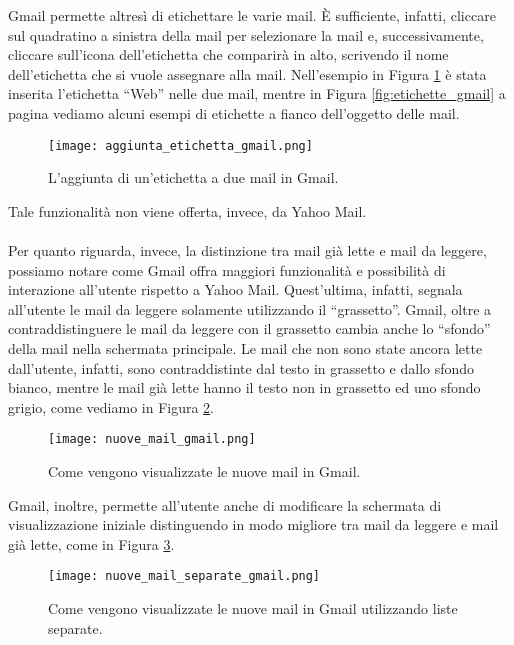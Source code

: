 		Gmail permette altresì di etichettare le varie mail. È sufficiente, infatti, cliccare sul quadratino a sinistra della mail per selezionare la mail e, successivamente, cliccare sull'icona dell'etichetta che comparirà in alto, scrivendo il nome dell'etichetta che si vuole assegnare alla mail. Nell'esempio in Figura \ref{fig:aggiunta_etichetta_gmail} è stata inserita l'etichetta ``Web'' nelle due mail, mentre in Figura \ref{fig:etichette_gmail} a pagina \pageref{fig:etichette_gmail} vediamo alcuni esempi di etichette a fianco dell'oggetto delle mail.
		\begin{figure}[h!]
			\begin{center}
				\texttt{[image: aggiunta\_etichetta\_gmail.png]}
			\end{center}
			\caption[Aggiunta di un'etichetta in Gmail]{L'aggiunta di un'etichetta a due mail in Gmail.}
			\label{fig:aggiunta_etichetta_gmail}
		\end{figure}
		
		Tale funzionalità non viene offerta, invece, da Yahoo Mail.\\
		\\
		Per quanto riguarda, invece, la distinzione tra mail già lette e mail da leggere, possiamo notare come Gmail offra maggiori funzionalità e possibilità di interazione all'utente rispetto a Yahoo Mail. Quest'ultima, infatti, segnala all'utente le mail da leggere solamente utilizzando il ``grassetto''. Gmail, oltre a contraddistinguere le mail da leggere con il grassetto cambia anche lo ``sfondo'' della mail nella schermata principale. Le mail che non sono state ancora lette dall'utente, infatti, sono contraddistinte dal testo in grassetto e dallo sfondo bianco, mentre le mail già lette hanno il testo non in grassetto ed uno sfondo grigio, come vediamo in Figura \ref{fig:nuove_mail_gmail}.
		\begin{figure}[h!]
			\begin{center}
				\texttt{[image: nuove\_mail\_gmail.png]}
			\end{center}
			\caption[Nuove mail in Gmail]{Come vengono visualizzate le nuove mail in Gmail.}
			\label{fig:nuove_mail_gmail}
		\end{figure}
		
		Gmail, inoltre, permette all'utente anche di modificare la schermata di visualizzazione iniziale distinguendo in modo migliore tra mail da leggere e mail già lette, come in Figura \ref{fig:nuove_mail_separate_gmail}.
		\begin{figure}[h!]
			\begin{center}
				\texttt{[image: nuove\_mail\_separate\_gmail.png]}
			\end{center}
			\caption[Nuove mail in Gmail, liste separate]{Come vengono visualizzate le nuove mail in Gmail utilizzando liste separate.}
			\label{fig:nuove_mail_separate_gmail}
		\end{figure}
		

